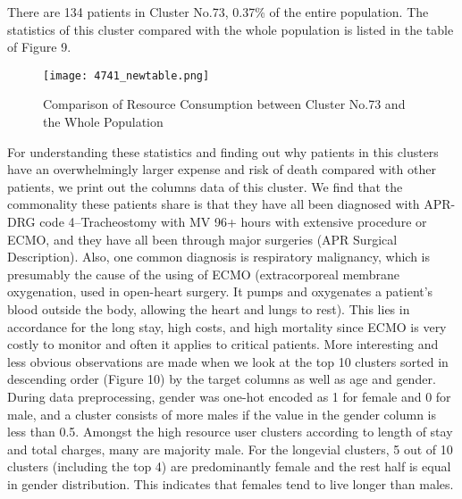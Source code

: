 \documentclass{article}
\begin{document}
\newline
\newline
There are 134 patients in Cluster No.73, 0.37\% of the entire population. The statistics of this cluster compared with the whole population is listed in the table of Figure 9.
\begin{figure}[H]
         \centering
         \texttt{[image: 4741\_newtable.png]}
         \caption{Comparison of Resource Consumption between Cluster No.73 and the Whole Population}
\end{figure}
\noindent
For understanding these statistics and finding out why patients in this clusters have an overwhelmingly larger expense and risk of death compared with other patients, we print out the columns data of this cluster. We find that the commonality these patients share is that they have all been diagnosed with APR-DRG code 4--Tracheostomy with MV 96+ hours with extensive procedure or ECMO, and they have all been through major surgeries (APR Surgical Description). Also, one common diagnosis is respiratory malignancy, which is presumably the cause of the using of ECMO (extracorporeal membrane oxygenation, used in open-heart surgery. It pumps and oxygenates a patient's blood outside the body, allowing the heart and lungs to rest). This lies in accordance for the long stay, high costs, and high mortality since ECMO is very costly to monitor and often it applies to critical patients.
\newline
\newline
More interesting and less obvious observations are made when we look at the top 10 clusters sorted in descending order (Figure 10) by the target columns as well as age and gender. During data preprocessing, gender was one-hot encoded as 1 for female and 0 for male, and a cluster consists of more males if the value in the gender column is less than 0.5. Amongst the high resource user clusters according to length of stay and total charges, many are majority male. For the longevial clusters, 5 out of 10 clusters (including the top 4) are predominantly female and the rest half is equal in gender distribution. This indicates that females tend to live longer than males.
\end{document}
